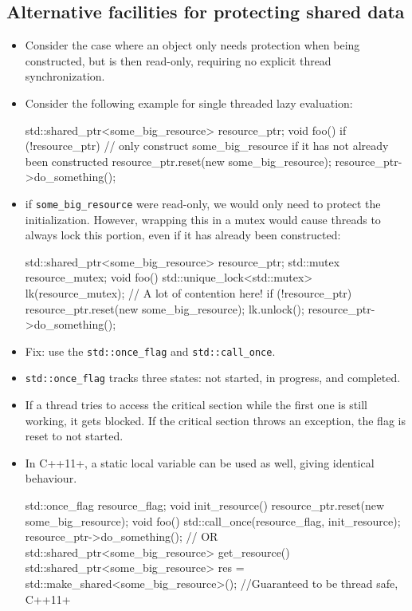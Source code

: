 \documentclass[11pt, a4paper]{article}
\theoremstyle{definition}
\theoremstyle{remark}
\newcommand{\code}[1]{\lstinline|#1|}
\begin{document}
\subsection{Alternative facilities for protecting shared data}
\begin{itemize}
    \item Consider the case where an object only needs protection when being constructed, but is then read-only, requiring no explicit thread synchronization. 
    \item Consider the following example for single threaded lazy evaluation:
\begin{cppcode}
std::shared_ptr<some_big_resource> resource_ptr;
void foo() {
    if (!resource_ptr) {// only construct some_big_resource if it has not already been constructed
        resource_ptr.reset(new some_big_resource);
    }
    resource_ptr->do_something();
}
\end{cppcode}
    \item if \code{some_big_resource} were read-only, we would only need to protect the initialization. However, wrapping this in a mutex would cause threads to always lock this portion, even if it has already been constructed:
\begin{cppcode}
std::shared_ptr<some_big_resource> resource_ptr;
std::mutex resource_mutex;
void foo() {
    std::unique_lock<std::mutex> lk(resource_mutex); // A lot of contention here!
    if (!resource_ptr) {
        resource_ptr.reset(new some_big_resource);
    }
    lk.unlock();
    resource_ptr->do_something();
}
\end{cppcode}
    \item Fix: use the \code{std::once_flag} and \code{std::call_once}. 
    \item \code{std::once_flag} tracks three states: not started, in progress, and completed. 
    \item If a thread tries to access the critical section while the first one is still working, it gets blocked. If the critical section throws an exception, the flag is reset to not started. 
    \item In C++11+, a static local variable can be used as well, giving identical behaviour.
\begin{cppcode}
std::once_flag resource_flag;
void init_resource() {
    resource_ptr.reset(new some_big_resource);
}
void foo() {
    std::call_once(resource_flag, init_resource);
    resource_ptr->do_something();
}
// OR 
std::shared_ptr<some_big_resource> get_resource() {
    std::shared_ptr<some_big_resource> res = std::make_shared<some_big_resource>(); //Guaranteed to be thread safe, C++11+
}
\end{cppcode}
\end{itemize}
\end{document}
